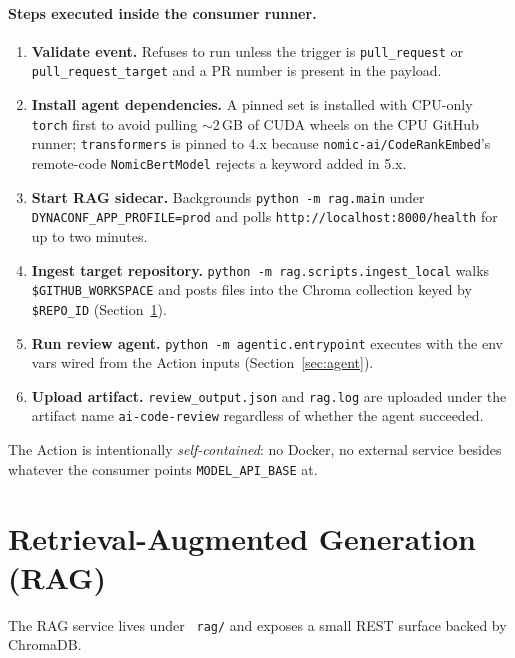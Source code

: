 \documentclass[11pt,a4paper]{article}
\newcommand{\code}[1]{\texttt{\small #1}}
\renewcommand{\path}[1]{\texttt{\small\color{mute} #1}}
\begin{document}
\paragraph{Steps executed inside the consumer runner.}
\begin{enumerate}[leftmargin=*,itemsep=2pt]
  \item \textbf{Validate event.} Refuses to run unless the trigger is
        \code{pull\_request} or \code{pull\_request\_target} and a PR number
        is present in the payload.
  \item \textbf{Install agent dependencies.} A pinned set is installed with
        CPU-only \code{torch} first to avoid pulling $\sim$2\,GB of CUDA
        wheels on the CPU GitHub runner; \code{transformers} is pinned to
        4.x because \code{nomic-ai/CodeRankEmbed}'s remote-code
        \code{NomicBertModel} rejects a keyword added in 5.x.
  \item \textbf{Start RAG sidecar.} Backgrounds \code{python -m rag.main}
        under \code{DYNACONF\_APP\_PROFILE=prod} and polls
        \code{http://localhost:8000/health} for up to two minutes.
  \item \textbf{Ingest target repository.}
        \code{python -m rag.scripts.ingest\_local} walks
        \code{\$GITHUB\_WORKSPACE} and posts files into the Chroma
        collection keyed by \code{\$REPO\_ID} (Section~\ref{sec:rag}).
  \item \textbf{Run review agent.} \code{python -m agentic.entrypoint}
        executes with the env vars wired from the Action inputs
        (Section~\ref{sec:agent}).
  \item \textbf{Upload artifact.} \code{review\_output.json} and
        \code{rag.log} are uploaded under the artifact name
        \code{ai-code-review} regardless of whether the agent succeeded.
\end{enumerate}

The Action is intentionally \emph{self-contained}: no Docker, no external
service besides whatever the consumer points \code{MODEL\_API\_BASE} at.

\section{Retrieval-Augmented Generation (RAG)}
\label{sec:rag}

The RAG service lives under \path{rag/} and exposes a small REST surface
backed by ChromaDB.
\end{document}
